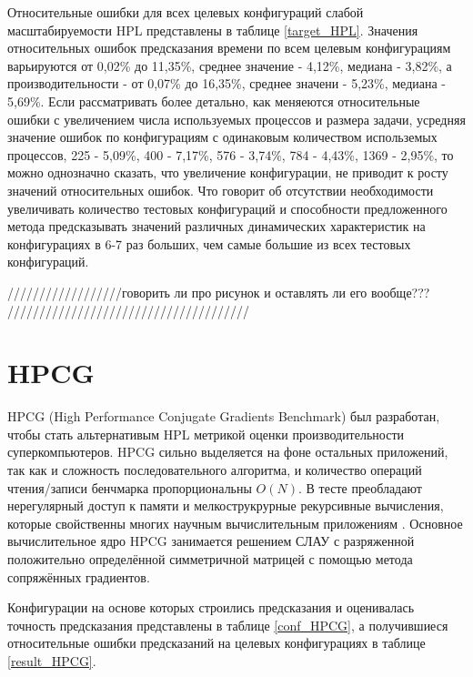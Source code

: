 	Относительные ошибки для всех целевых конфигураций слабой масштабируемости HPL представлены в таблице \ref{target_HPL}. Значения относительных ошибок предсказания времени по всем целевым конфигурациям варьируются от 0,02\% до 11,35\%, среднее значение - 4,12\%, медиана - 3,82\%, а производительности - от 0,07\% до 16,35\%, среднее значени - 5,23\%, медиана - 5,69\%. Если рассматривать более детально, как меняеются относительные ошибки с увеличением числа используемых процессов и размера задачи, усредняя значение ошибок по конфигурациям с одинаковым количеством использемых процессов, 225 - 5,09\%, 400 - 7,17\%, 576 - 3,74\%, 784 - 4,43\%, 1369 - 2,95\%, то можно однозначно сказать, что увеличение конфигурации, не приводит к росту значений относительных ошибок. Что говорит об отсутствии необходимости увеличивать количество тестовых конфигураций и способности предложенного метода предсказывать значений различных динамических характеристик на конфигурациях в 6-7 раз больших, чем самые большие из всех тестовых конфигураций.

	//////////////////говорить ли про рисунок и оставлять ли его вообще??? //////////////////////////////////////

	\section{HPCG}

	HPCG (High Performance Conjugate Gradients Benchmark) был разработан, чтобы стать альтернативым HPL метрикой оценки производительности суперкомпьютеров. HPCG сильно выделяется на фоне остальных приложений, так как и сложность последовательного алгоритма, и количество операций чтения/записи бенчмарка пропорциональны \(O(N)\). В тесте преобладают нерегулярный доступ к памяти и мелкострукрурные рекурсивные вычисления, которые свойственны многих научным вычислительным приложениям \cite{HPCG}. Основное вычислительное ядро HPCG занимается решением СЛАУ с разряженной положительно определённой симметричной матрицей с помощью метода сопряжённых градиентов.

	Конфигурации на основе которых строились предсказания и оценивалась точность предсказания представлены в таблице \ref{conf_HPCG}, а получившиеся относительные ошибки предсказаний на целевых конфигурациях в таблице \ref{result_HPCG}.

